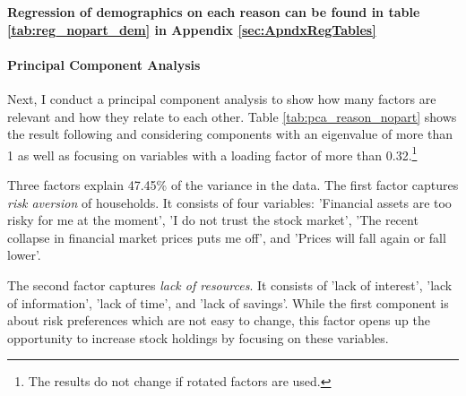 \documentclass[ProjectABM]{subfiles}
\begin{document}


\textbf{Regression of demographics on each reason can be found in table \ref{tab:reg_nopart_dem} in Appendix \ref{sec:ApndxRegTables} }



\paragraph{Principal Component Analysis}

Next, I conduct a principal component analysis to show how many factors are relevant and how they relate to each other. Table \ref{tab:pca_reason_nopart} shows the result following \cite{choi_2020, tabachnick_fidell_2007} and considering components with an eigenvalue of more than 1 as well as focusing on variables with a loading factor of more than 0.32.\footnote{The results do not change if rotated factors are used.}

Three factors explain 47.45\% of the variance in the data. The first factor captures \textit{risk aversion} of households. It consists of four variables: 'Financial assets are too risky for me at the moment', 'I do not trust the stock market', 'The recent collapse in financial market prices puts me off', and 'Prices will fall again or fall lower'. 

The second factor captures \textit{lack of resources}. It consists of 'lack of interest', 'lack of information', 'lack of time', and 'lack of savings'. While the first component is about risk preferences which are not easy to change, this factor opens up the opportunity to increase stock holdings by focusing on these variables.
\end{document}
